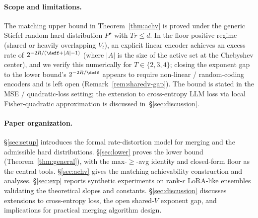 \paragraph{Scope and limitations.} The matching upper bound
in Theorem~\ref{thm:achv} is proved under the generic
Stiefel-random hard distribution $P^\star$ with $Tr\leq d$.
In the floor-positive regime (shared or heavily overlapping
$V_t$), an explicit linear encoder achieves an excess rate of
$2^{-2R/(\deff+|A|-1)}$ (where $|A|$ is the size of the
active set at the Chebyshev center), and we verify this
numerically for $T\in\{2,3,4\}$; closing the exponent gap to
the lower bound's $2^{-2R/\deff}$ appears to require
non-linear / random-coding encoders and is left open
(Remark~\ref{rem:sharedv-gap}). The bound is stated in the
MSE / quadratic-loss setting; the extension to cross-entropy
LLM loss via local Fisher-quadratic approximation is
discussed in~\S\ref{sec:discussion}.

\paragraph{Paper organization.}
\S\ref{sec:setup} introduces the formal rate-distortion model
for merging and the admissible hard distributions.
\S\ref{sec:lower} proves the lower bound
(Theorem~\ref{thm:general}), with the max-$\geq$-avg identity
and closed-form floor as the central tools. \S\ref{sec:achv}
gives the matching achievability construction and analyses.
\S\ref{sec:exp} reports synthetic experiments on rank-$r$
LoRA-like ensembles validating the theoretical slopes and
constants. \S\ref{sec:discussion} discusses extensions to
cross-entropy loss, the open shared-$V$ exponent gap, and
implications for practical merging algorithm design.
